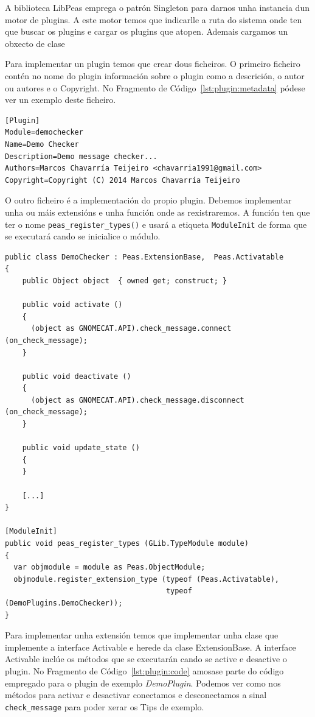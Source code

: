 A biblioteca LibPeas emprega o patrón Singleton para darnos unha instancia dun motor de plugins. A este motor temos que indicarlle a ruta do sistema onde ten que buscar os plugins e cargar os plugins que atopen. Ademais cargamos un obxecto de clase

Para implementar un plugin temos que crear dous ficheiros. O primeiro ficheiro contén no nome do plugin información sobre o plugin como a descrición, o autor ou autores e o Copyright. No Fragmento de Código~\ref{lst:plugin:metadata} pódese ver un exemplo deste ficheiro.

\begin{lstlisting}[label=lst:plugin:metadata,caption=Ficheiro de metadatos do plugin]
[Plugin]
Module=demochecker
Name=Demo Checker
Description=Demo message checker...
Authors=Marcos Chavarría Teijeiro <chavarria1991@gmail.com>
Copyright=Copyright (C) 2014 Marcos Chavarría Teijeiro
\end{lstlisting}

O outro ficheiro é a implementación do propio plugin. Debemos implementar unha ou máis extensións e unha función onde as rexistraremos. A función ten que ter o nome \lstinline{peas_register_types()} e usará a etiqueta \lstinline{ModuleInit} de forma que se executará cando se inicialice o módulo.

\begin{lstlisting}[label=lst:plugin:code,caption=Fragmento da implementación do plugin DemoChecker]
public class DemoChecker : Peas.ExtensionBase,  Peas.Activatable
{
    public Object object  { owned get; construct; }

    public void activate ()
    {
      (object as GNOMECAT.API).check_message.connect (on_check_message);
    }

    public void deactivate ()
    {
      (object as GNOMECAT.API).check_message.disconnect (on_check_message);
    }

    public void update_state ()
    {
    }

    [...]
}

[ModuleInit]
public void peas_register_types (GLib.TypeModule module)
{
  var objmodule = module as Peas.ObjectModule;
  objmodule.register_extension_type (typeof (Peas.Activatable),
                                     typeof (DemoPlugins.DemoChecker));
}
\end{lstlisting}

Para implementar unha extensión temos que implementar unha clase que implemente a interface Activable e herede da clase ExtensionBase. A interface Activable inclúe os métodos que se executarán cando se active e desactive o plugin. No Fragmento de Código~\ref{lst:plugin:code} amosase parte do código empregado para o plugin de exemplo \emph{DemoPlugin}. Podemos ver como nos métodos para activar e desactivar conectamos e desconectamos a sinal \lstinline{check_message} para poder xerar os Tips de exemplo.

